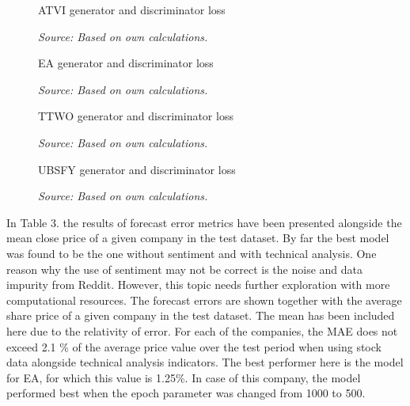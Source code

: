\documentclass[review]{elsarticle} %
\begin{document}
\begin{figure}[H]
\caption{ATVI generator and discriminator loss}
\begin{adjustbox}{width=1.3\textwidth,center}

\end{adjustbox}
\caption*{\textit{Source: Based on own calculations.}}
\end{figure}

\begin{figure}[H]
\caption{EA generator and discriminator loss}
\begin{adjustbox}{width=1.3\textwidth,center}

\end{adjustbox}
\caption*{\textit{Source: Based on own calculations.}}
\end{figure}


\begin{figure}[H]
\caption{TTWO generator and discriminator loss}
\begin{adjustbox}{width=1.3\textwidth,center}

\end{adjustbox}
\caption*{\textit{Source: Based on own calculations.}}
\end{figure}

\begin{figure}[H]
\caption{UBSFY generator and discriminator loss}
\begin{adjustbox}{width=1.3\textwidth,center}

\end{adjustbox}
\caption*{\textit{Source: Based on own calculations.}}
\end{figure}


In Table 3. the results of forecast error metrics have been presented alongside the mean close price of a given company in the test dataset. By far the best model was found to be the one without sentiment and with technical analysis. One reason why the use of sentiment may not be correct is the noise and data impurity from Reddit. However, this topic needs further exploration with more computational resources. 
The forecast errors are shown together with the average share price of a given company in the test dataset. The mean has been included here due to the relativity of error. For each of the companies, the MAE does not exceed 2.1 \% of the average price value over the test period when using stock data alongside technical analysis indicators. The best performer here is the model for EA, for which this value is 1.25\%. In case of this company, the model performed best when the epoch parameter was changed from 1000 to 500.
\end{document}

